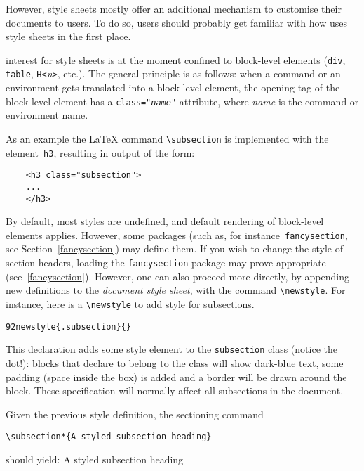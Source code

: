 However, style sheets mostly offer an additional mechanism to
customise their documents to \hevea{} users. To do so, users should
probably get familiar with how \hevea{} uses style sheets in the first
place.

\hevea{} interest for style sheets is at the moment confined to
block-level elements (\verb+div+, \verb+table+, \verb+H<+\textit{n}\verb+>+,
etc.).
The general principle is as follows: when a command or an
environment gets translated into a block-level element,
the opening tag of the block level element has a
\texttt{class="\textit{name}"} attribute, where \textit{name} is the
command or environment name.

As an example the \LaTeX{} command \verb+\subsection+
 is implemented with the element~\verb+h3+, resulting in
\html{} output of the form:
\begin{verbatim}
    <h3 class="subsection">
    ...
    </h3>
\end{verbatim}
By default, most styles are undefined, and default rendering of
block-level elements applies. However, some packages (such as, for
instance~\texttt{fancysection}, see Section~\ref{fancysection}) may
define them.
%
If you wish to change the style of section headers, loading the
\texttt{fancysection} package may prove appropriate (see~\ref{fancysection}).
However, one can also proceed more directly, by appending new
definitions to the \emph{document style
sheet}, with the command \verb+\newstyle+.
For instance, here is a \verb+\newstyle+ to add style for subsections.
\begin{alltt}
  \char92newstyle\{.subsection\}\{\stylex\}
\end{alltt}
This declaration adds some style element to the
\texttt{subsection} class (notice the dot!):
blocks that declare to belong to the class
will show dark-blue text, some padding
(space inside the box) is added and a border will be drawn around the block.
These specification will normally affect all subsections in the document.
\begin{htmlonly}
Given the previous style definition, the sectioning command
\begin{verbatim}
\subsection*{A styled subsection heading}
\end{verbatim}
should yield:
A styled subsection heading
\end{htmlonly}

